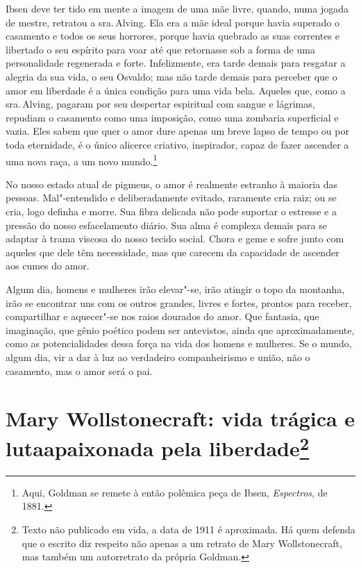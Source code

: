 Ibsen deve ter tido em mente a imagem de uma mãe livre, quando, numa
jogada de mestre, retratou a sra.\,Alving. Ela era a mãe ideal porque
havia superado o casamento e todos os seus horrores, porque havia
quebrado as suas correntes e libertado o seu espírito para voar até que
retornasse sob a forma de uma personalidade regenerada e forte.
Infelizmente, era tarde demais para resgatar a alegria da sua vida, o
seu Osvaldo; mas não tarde demais para perceber que o amor em liberdade
é a única condição para uma vida bela. Aqueles que, como a sra.\,Alving,
pagaram por seu despertar espiritual com sangue e lágrimas, repudiam o
casamento como uma imposição, como uma zombaria superficial e vazia.
Eles sabem que quer o amor dure apenas um breve lapso de tempo ou por
toda eternidade, é o único alicerce criativo, inspirador, capaz de fazer
ascender a uma nova raça, a um novo mundo.\footnote{Aqui, Goldman se remete à então polêmica peça de Ibsen, \textit{Espectros}, de 1881.}

No nosso estado atual de pigmeus, o amor é realmente estranho à maioria
das pessoas. Mal"-entendido e deliberadamente evitado, raramente cria
raiz; ou se cria, logo definha e morre. Sua fibra delicada não pode
suportar o estresse e a pressão do nosso esfacelamento diário. Sua alma é complexa
demais para se adaptar à trama viscosa do nosso tecido social. Chora e
geme e sofre junto com aqueles que dele têm necessidade, mas que carecem
da capacidade de ascender aos cumes do amor.

Algum dia, homens e mulheres irão elevar"-se, irão atingir o topo da
montanha, irão se encontrar uns com os outros grandes, livres e fortes,
prontos para receber, compartilhar e aquecer"-se nos raios dourados do
amor. Que fantasia, que imaginação, que gênio poético podem ser antevistos, ainda que aproximadamente, como as potencialidades dessa força na vida
dos homens e mulheres. Se o mundo, algum dia, vir a dar à luz ao verdadeiro
companheirismo e união, não o casamento, mas o amor será o pai.

\chapter[Mary Wollstonecraft: vida trágica e luta apaixonada pela liberdade]{Mary Wollstonecraft: vida trágica e luta\break apaixonada pela
liberdade\footnote{Texto não publicado em vida, a data de 1911 é
  aproximada. Há quem defenda que o escrito diz respeito não apenas a um retrato de
  Mary Wollstonecraft, mas também um autorretrato da própria Goldman.}}

